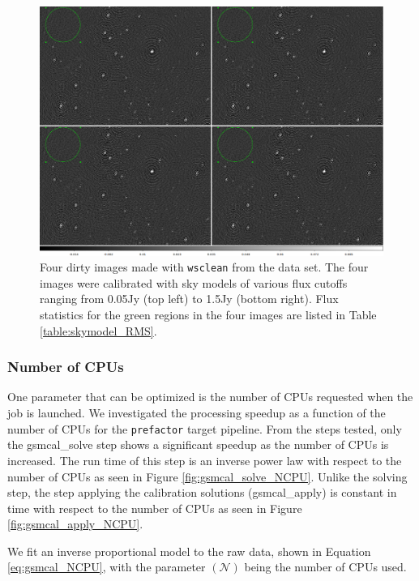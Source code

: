 \documentclass[preprint,5p]{elsarticle}
\begin{document}
\begin{figure}
    \includegraphics[width=0.95\linewidth]{figures/skymodel_images.png}
      \caption{Four dirty images made with \texttt{wsclean} from the data set. The four images were calibrated with sky models of various flux cutoffs ranging from 0.05Jy (top left) to 1.5Jy (bottom right). Flux statistics for the green regions in the four images are listed in Table \ref{table:skymodel_RMS}.}
	\label{fig:skymodel_images}
\end{figure}

\subsubsection{Number of CPUs}
One parameter that can be optimized is the number of CPUs requested when the job is launched. We investigated the processing speedup as a function of the number of CPUs for the \texttt{prefactor} target pipeline. From the steps tested, only the gsmcal\_solve step shows a significant speedup as the number of CPUs is increased. The run time of this step is an inverse power law with respect to the number of CPUs as seen in Figure \ref{fig:gsmcal_solve_NCPU}. Unlike the solving step, the step applying the calibration solutions (gsmcal\_apply) is constant in time with respect to the number of CPUs as seen in Figure \ref{fig:gsmcal_apply_NCPU}. 

We fit an inverse proportional model to the raw data, shown in Equation \ref{eq:gsmcal_NCPU}, with the parameter $(\mathcal{N})$ being the number of CPUs used. 
\end{document}
